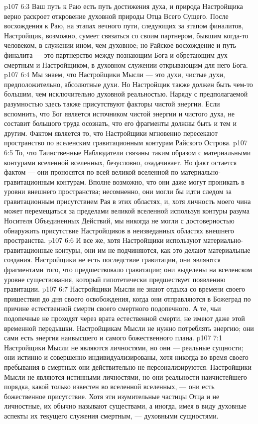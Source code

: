 \vs p107 6:3 Ваш путь к Раю есть путь достижения духа, и природа Настройщика верно раскроет откровение духовной природы Отца Всего Сущего. После восхождения к Раю, на этапах вечного пути, следующих за этапом финалитов, Настройщик, возможно, сумеет связаться со своим партнером, бывшим когда\hyp{}то человеком, в служении ином, чем духовное; но Райское восхождение и путь финалита --- это партнерство между познающим Бога и обретающим дух смертным и Настройщиком, в духовном служении открывающим для него Бога.
\vs p107 6:4 \pc Мы знаем, что Настройщики Мысли --- это духи, чистые духи, предположительно, абсолютные духи. Но Настройщик также должен быть чем\hyp{}то большим, чем исключительно духовной реальностью. Наряду с предполагаемой разумностью здесь также присутствуют факторы чистой энергии. Если вспомнить, что Бог является источником чистой энергии и чистого духа, не составит большого труда осознать, что его фрагменты должны быть и тем и другим. Фактом является то, что Настройщики мгновенно пересекают пространство по вселенским гравитационным контурам Райского Острова.
\vs p107 6:5 То, что Таинственные Наблюдатели связаны таким образом с материальными контурами вселенной вселенных, безусловно, озадачивает. Но факт остается фактом --- они проносятся по всей великой вселенной по материально\hyp{}гравитационным контурам. Вполне возможно, что они даже могут проникать в уровни внешнего пространства; несомненно, они могли бы идти следом за гравитационным присутствием Рая в этих областях, и, хотя личность моего чина может перемещаться за пределами великой вселенной используя контуры разума Носителя Объединенных Действий, мы никогда не могли с достоверностью обнаружить присутствие Настройщиков в неизведанных областях внешнего пространства.
\vs p107 6:6 И все же, хотя Настройщики используют материально\hyp{}гравитационные контуры, они им не подчиняются, как это делают материальные создания. Настройщики не есть последствие гравитации, они являются фрагментами того, что предшествовало гравитации; они выделены на вселенском уровне существования, который гипотетически предшествует появлению гравитации.
\vs p107 6:7 Настройщики Мысли не знают отдыха со времени своего пришествия до дня своего освобождения, когда они отправляются в Божеград по причине естественной смерти своего смертного подопечного. А те, чьи подопечные не проходят через врата естественной смерти, не имеют даже этой временной передышки. Настройщикам Мысли не нужно потреблять энергию; они сами есть энергия наивысшего и самого божественного плана.
\vs p107 7:1 Настройщики Мысли не являются личностями, но они --- реальные сущности; они истинно и совершенно индивидуализированы, хотя никогда во время своего пребывания в смертных они действительно не персонализируются. Настройщики Мысли не являются истинными личностями, но они  реальности наичистейшего порядка, какой только известен во вселенной вселенных, --- они есть божественное присутствие. Хотя эти изумительные частицы Отца и не личностные, их обычно называют существами, а иногда, имея в виду духовные аспекты их текущего служения смертным, --- духовными сущностями.
